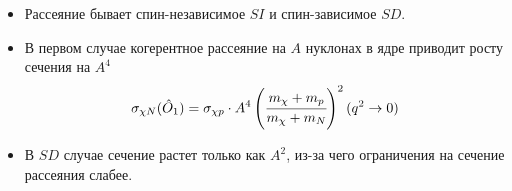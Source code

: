 \begin{itemize}
	\item Рассеяние бывает спин-независимое $SI$ и спин-зависимое $SD$. 
	\item В первом случае когерентное рассеяние на $A$ нуклонах в ядре приводит росту сечения на $A^4$
	\begin{equation*}
		\sigma_{\chi N}(\hat{O}_1) = \sigma_{\chi p}\cdot A^4 \left(\cfrac{m_{\chi}+m_{p}}{m_{\chi} + m_{N}}\right)^2 (q^2 \rightarrow 0)
	\end{equation*}
	\item В $SD$ случае сечение растет только как $A^2$, из-за чего ограничения на сечение рассеяния слабее.
\end{itemize}